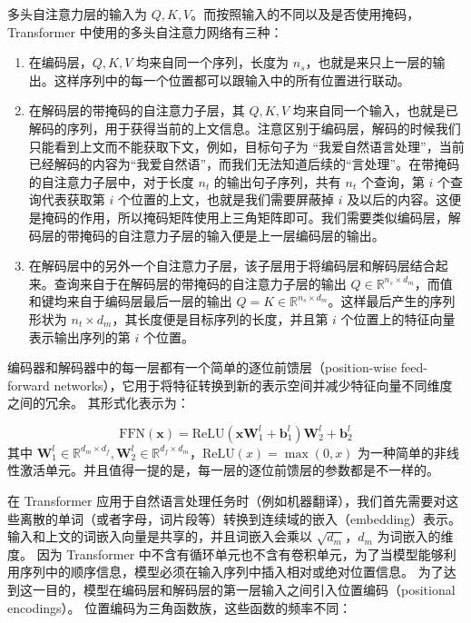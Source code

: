 多头自注意力层的输入为 $Q,K,V$。而按照输入的不同以及是否使用掩码，Transformer 中使用的多头自注意力网络有三种：

\begin{enumerate}[(1)]
	\item 在编码层，$Q,K,V$ 均来自同一个序列，长度为 $n_s$，也就是来只上一层的输出。这样序列中的每一个位置都可以跟输入中的所有位置进行联动。
	\item 在解码层的带掩码的自注意力子层，其 $Q,K,V$ 均来自同一个输入，也就是已解码的序列，用于获得当前的上文信息。注意区别于编码层，解码的时候我们只能看到上文而不能获取下文，例如，目标句子为 “我爱自然语言处理”，当前已经解码的内容为“我爱自然语”，而我们无法知道后续的“言处理”。在带掩码的自注意力子层中，对于长度 $n_t$ 的输出句子序列，共有 $n_t$ 个查询，第 $i$ 个查询代表获取第 $i$ 个位置的上文，也就是我们需要屏蔽掉 $i$ 及以后的内容。这便是掩码的作用，所以掩码矩阵使用上三角矩阵即可。我们需要类似编码层，解码层的带掩码的自注意力子层的输入便是上一层编码层的输出。
	\item 在解码层中的另外一个自注意力子层，该子层用于将编码层和解码层结合起来。查询来自于在解码层的带掩码的自注意力子层的输出 $Q \in \mathbb{R}^{n_s \times d_m}$，而值和键均来自于编码层最后一层的输出 $Q = K \in \mathbb{R}^{n_s \times d_m}$。这样最后产生的序列形状为 $n_t \times d_m$，其长度便是目标序列的长度，并且第 $i$ 个位置上的特征向量表示输出序列的第 $i$ 个位置。
\end{enumerate}

编码器和解码器中的每一层都有一个简单的逐位前馈层（position-wise feed-forward networks），它用于将特征转换到新的表示空间并减少特征向量不同维度之间的冗余。
其形式化表示为：

\begin{equation}
	\text{FFN}(\bm{x}) = \text{ReLU}(\bm{x} \bm{W}_1^{l} + \bm{b}_1^{l}) \bm{W}_2^{l} + \bm{b}_2^{l}
\end{equation}
其中 $\bm{W}_1^{l} \in \mathbb{R}^{d_m \times d_f}, \bm{W}_2^{l} \in \mathbb{R}^{d_f \times d_m}$，$\text{ReLU}(x) = \max(0, x)$ 为一种简单的非线性激活单元。并且值得一提的是，每一层的逐位前馈层的参数都是不一样的。

在 Transformer 应用于自然语言处理任务时（例如机器翻译），我们首先需要对这些离散的单词（或者字母，词片段等）转换到连续域的嵌入（embedding）表示。
输入和上文的词嵌入向量是共享的，并且词嵌入会乘以 $\sqrt{d_m}$，$d_m$ 为词嵌入的维度。
因为 Transformer 中不含有循环单元也不含有卷积单元，为了当模型能够利用序列中的顺序信息，模型必须在输入序列中插入相对或绝对位置信息。
为了达到这一目的，模型在编码层和解码层的第一层输入之间引入位置编码（positional encodings）。
位置编码为三角函数族，这些函数的频率不同：

